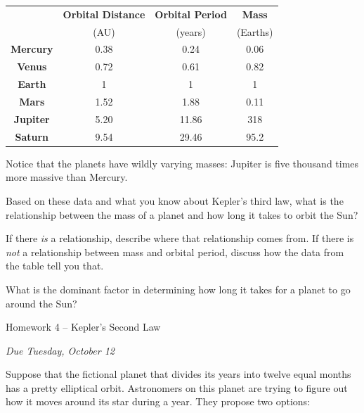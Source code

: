 \documentclass[12pt]{article}
\begin{document}
\begin{center}
	
	
\begin{tabular}{|c|c|c|c|}
	\hline
 & {\bf Orbital Distance} & {\bf Orbital Period} & {\bf Mass} \\
	& (AU) & (years) & (Earths) \\ \hline
	\bf Mercury & 0.38 & 0.24 & 0.06 \\ \hline
	\bf Venus & 0.72 & 0.61 & 0.82 \\ \hline
	\bf Earth & 1 & 1 & 1 \\ \hline
	\bf Mars & 1.52 & 1.88 & 0.11 \\ \hline
	\bf Jupiter & 5.20 & 11.86 & 318 \\ \hline
	\bf Saturn & 9.54 & 29.46 & 95.2 \\ \hline
\end{tabular}

Notice that the planets have wildly varying masses: Jupiter is five thousand times more massive than Mercury.

\end{center}

	Based on these data and what you know about Kepler's third law, what is the relationship between the mass of a planet and how long it takes to orbit the Sun?
	
	\vspace{1.5in}
	
	If there {\it is} a relationship, describe where that relationship comes from. If there is {\it not} a relationship between mass and orbital period, discuss how the data from the table tell you that.
	
	\vspace{1.5in} 
	
	What is the dominant factor in determining how long it takes for a planet to go around the Sun?





\newpage

\begin{center}
	\sc \Large Homework 4 -- Kepler's Second Law
	
	\normalsize \it Due Tuesday, October 12
\end{center}

Suppose that the fictional planet that divides its years into twelve equal months has a pretty elliptical orbit. Astronomers on this planet are trying to figure out how it moves around its star during a year. They propose two options:
\end{document}
